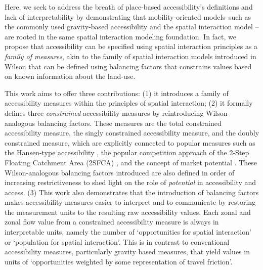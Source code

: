 \documentclass[
  10pt,
  letterpaper,
]{article}
\begin{document}
Here, we seek to address the breath of place-based accessibility's
definitions and lack of interpretability by demonstrating that
mobility-oriented models--such as the commonly used gravity-based
accessibility \citep[e.g.,][]{hansen1959} and the spatial interaction
model \citep[e.g.,][]{wilson1971}-- are rooted in the same spatial
interaction modeling foundation. In fact, we propose that accessibility
can be specified using spatial interaction principles as a \emph{family
of measures}, akin to the family of spatial interaction models
introduced in Wilson \citep{wilson1971} that can be defined using
balancing factors that constrains values based on known information
about the land-use.

This work aims to offer three contributions: (1) it introduces a family
of accessibility measures within the principles of spatial interaction;
(2) it formally defines three \emph{constrained} accessibility measures
by reintroducing Wilson-analogous balancing factors. These measures are
the total constrained accessibility measure, the singly constrained
accessibility measure, and the doubly constrained measure, which are
explicitly connected to popular measures such as the Hansen-type
accessibility \citep{hansen1959}, the popular competition approach of
the 2-Step Floating Catchment Area (2SFCA)
\citep{shenLocationCharacteristicsInnercity1998, luo2003}, and the
concept of market potential
\citep{harris_market_1954, vickermanAccessibilityAttractionPotential1974}.
These Wilson-analogous balancing factors introduced are also defined in
order of increasing restrictiveness to shed light on the role of
\emph{potential} in accessibility and access. (3) This work also
demonstrates that the introduction of balancing factors makes
accessibility measures easier to interpret and to communicate by
restoring the measurement units to the resulting raw accessibility
values. Each zonal and zonal flow value from a constrained accessibility
measure is always in interpretable units, namely the number of
`opportunities for spatial interaction' or `population for spatial
interaction'. This is in contrast to conventional accessibility
measures, particularly gravity based measures, that yield values in
units of `opportunities weighted by some representation of travel
friction'.
\end{document}
